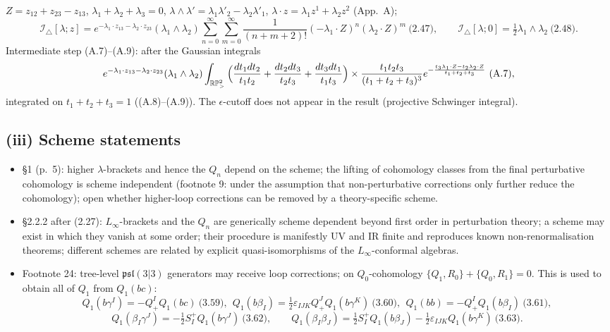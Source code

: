 \documentclass[10pt]{article}
\newcommand{\Itri}{\mathcal I_{\triangle}}
\begin{document}
$Z=z_{12}+z_{23}-z_{13}$, $\lambda_1+\lambda_2+\lambda_3=0$, $\lambda\wedge\lambda'=\lambda_1\lambda'_2-\lambda_2\lambda'_1$, $\lambda\cdot z=\lambda_1z^1+\lambda_2z^2$ (App.~A);
\begin{equation*}
\Itri[\lambda;z]=e^{-\lambda_1\cdot z_{13}-\lambda_2\cdot z_{23}}(\lambda_1\wedge\lambda_2)\sum_{n=0}^\infty\sum_{m=0}^\infty\frac{1}{(n+m+2)!}(-\lambda_1\cdot Z)^n(\lambda_2\cdot Z)^m\ \text{(2.47)},\qquad \Itri[\lambda;0]=\tfrac12\lambda_1\wedge\lambda_2\ \text{(2.48)}.
\end{equation*}
Intermediate step (A.7)--(A.9): after the Gaussian integrals
\begin{equation*}
e^{-\lambda_1\cdot z_{13}-\lambda_2\cdot z_{23}}(\lambda_1\wedge\lambda_2)\int_{\mathbb{RP}^2_>}\Big(\frac{dt_1dt_2}{t_1t_2}+\frac{dt_2dt_3}{t_2t_3}+\frac{dt_3dt_1}{t_1t_3}\Big)\\\times\frac{t_1t_2t_3}{(t_1+t_2+t_3)^3}e^{-\frac{t_3\lambda_1\cdot Z-t_2\lambda_2\cdot Z}{t_1+t_2+t_3}}\ \text{(A.7)},
\end{equation*}
integrated on $t_1+t_2+t_3=1$ ((A.8)--(A.9)). The $\epsilon$-cutoff does not appear in the result (projective Schwinger integral).

\subsection{(iii) Scheme statements}
\begin{itemize}
\item \S1 (p.~5): higher $\lambda$-brackets and hence the $Q_n$ depend on the scheme; the lifting of cohomology classes from the final perturbative cohomology is scheme independent (footnote 9: under the assumption that non-perturbative corrections only further reduce the cohomology); open whether higher-loop corrections can be removed by a theory-specific scheme.
\item \S2.2.2 after (2.27): $L_\infty$-brackets and the $Q_n$ are generically scheme dependent beyond first order in perturbation theory; a scheme may exist in which they vanish at some order; their procedure is manifestly UV and IR finite and reproduces known non-renormalisation theorems; different schemes are related by explicit quasi-isomorphisms of the $L_\infty$-conformal algebras.
\item Footnote 24: tree-level $\mathfrak{psl}(3|3)$ generators may receive loop corrections; on $Q_0$-cohomology $\{Q_1,R_0\}+\{Q_0,R_1\}=0$. This is used to obtain all of $Q_1$ from $Q_1(bc)$:
\begin{equation*}
Q_1(b\gamma^I)=-Q^I_+Q_1(bc)\ \text{(3.59)},\ \ Q_1(b\beta_I)=\tfrac12\varepsilon_{IJK}Q^J_+Q_1(b\gamma^K)\ \text{(3.60)},\ \ Q_1(bb)=-Q^I_+Q_1(b\beta_I)\ \text{(3.61)},
\end{equation*}
\begin{equation*}
Q_1(\beta_I\gamma^J)=-\tfrac12S^+_IQ_1(b\gamma^J)\ \text{(3.62)},\qquad Q_1(\beta_I\beta_J)=\tfrac12S^+_IQ_1(b\beta_J)-\tfrac12\varepsilon_{IJK}Q_1(b\gamma^K)\ \text{(3.63)}.
\end{equation*}
\end{itemize}
\end{document}
